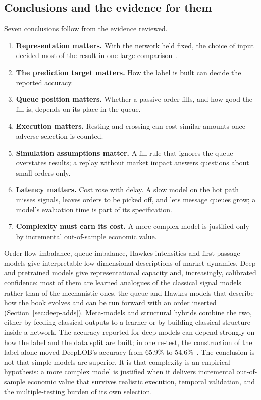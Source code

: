 \subsection{Conclusions and the evidence for them}
\label{sec:conclusions-list}

Seven conclusions follow from the evidence reviewed.
\begin{enumerate}[leftmargin=1.8em,itemsep=2pt]
\item \textbf{Representation matters.} With the network held fixed, the choice of input decided most of the result
  in one large comparison~\citep{lucchese2024}.
\item \textbf{The prediction target matters.} How the label is built can decide the reported accuracy.
\item \textbf{Queue position matters.} Whether a passive order fills, and how good the fill is, depends on its place
  in the queue.
\item \textbf{Execution matters.} Resting and crossing can cost similar amounts once adverse selection is counted.
\item \textbf{Simulation assumptions matter.} A fill rule that ignores the queue overstates results; a replay without
  market impact answers questions about small orders only.
\item \textbf{Latency matters.} Cost rose with delay. A slow model on the hot path misses signals,
  leaves orders to be picked off, and lets message queues grow; a model's evaluation time is part of its
  specification.
\item \textbf{Complexity must earn its cost.} A more complex model is justified only by incremental out-of-sample
  economic value.
\end{enumerate}

Order-flow imbalance, queue imbalance, Hawkes intensities and first-passage models give
interpretable low-dimensional descriptions of market dynamics. Deep and pretrained models give
representational capacity and, increasingly, calibrated confidence; most of them are learned analogues of
the classical signal models rather than of the mechanistic ones, the queue and Hawkes models that describe how the
book evolves and can be run forward with an order inserted (Section~\ref{sec:deep-adds}). Meta-models and
structural hybrids combine the two, either by feeding classical outputs to a learner or by building classical
structure inside a network. The accuracy reported for deep models can depend strongly on how the label and the data
split are built; in one re-test, the construction of the label alone moved DeepLOB's accuracy from 65.9\% to
54.6\%~\citep{lee2024predictability}. The conclusion is not that simple models are superior. It is that complexity is an
empirical hypothesis: a more complex model is justified when it delivers incremental out-of-sample
economic value that survives realistic execution, temporal validation, and the multiple-testing
burden of its own selection.

